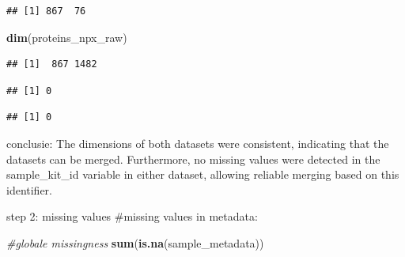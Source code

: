 \documentclass[
]{article}
\newenvironment{Shaded}{\begin{snugshade}}{\end{snugshade}}
\newcommand{\CommentTok}[1]{\textcolor[rgb]{0.56,0.35,0.01}{\textit{#1}}}
\newcommand{\FunctionTok}[1]{\textcolor[rgb]{0.13,0.29,0.53}{\textbf{#1}}}
\newcommand{\NormalTok}[1]{#1}
\newcommand{\SpecialCharTok}[1]{\textcolor[rgb]{0.81,0.36,0.00}{\textbf{#1}}}
\begin{document}
\begin{verbatim}
## [1] 867  76
\end{verbatim}

\begin{Shaded}
\begin{Highlighting}[]
\FunctionTok{dim}\NormalTok{(proteins\_npx\_raw)}
\end{Highlighting}
\end{Shaded}

\begin{verbatim}
## [1]  867 1482
\end{verbatim}

\begin{Shaded}
\end{Shaded}

\begin{verbatim}
## [1] 0
\end{verbatim}

\begin{Shaded}
\end{Shaded}

\begin{verbatim}
## [1] 0
\end{verbatim}

conclusie: The dimensions of both datasets were consistent, indicating
that the datasets can be merged. Furthermore, no missing values were
detected in the sample\_kit\_id variable in either dataset, allowing
reliable merging based on this identifier.

step 2: missing values \#missing values in metadata:

\begin{Shaded}
\begin{Highlighting}[]
\CommentTok{\#globale missingness}
\FunctionTok{sum}\NormalTok{(}\FunctionTok{is.na}\NormalTok{(sample\_metadata))}
\end{Highlighting}
\end{Shaded}
\end{document}
